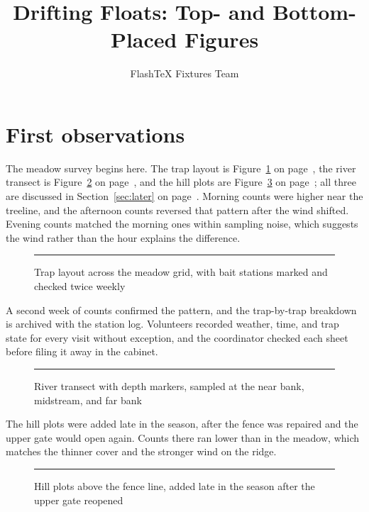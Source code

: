 \documentclass[11pt]{article}
\title{Drifting Floats: Top- and Bottom-Placed Figures}
\author{FlashTeX Fixtures Team}
\date{}
\begin{document}
\maketitle
\listoffigures
\section{First observations}
\label{sec:first}
The meadow survey begins here. The trap layout is Figure~\ref{fig:traps} on page~\pageref{fig:traps}, the river transect is Figure~\ref{fig:transect} on page~\pageref{fig:transect}, and the hill plots are Figure~\ref{fig:hill} on page~\pageref{fig:hill}; all three are discussed in Section~\ref{sec:later} on page~\pageref{sec:later}. Morning counts were higher near the treeline, and the afternoon counts reversed that pattern after the wind shifted. Evening counts matched the morning ones within sampling noise, which suggests the wind rather than the hour explains the difference.
\begin{figure}[t]
\centering
\rule{0.7\textwidth}{2.5cm}
\caption{Trap layout across the meadow grid, with bait stations marked and checked twice weekly}
\label{fig:traps}
\end{figure}
A second week of counts confirmed the pattern, and the trap-by-trap breakdown is archived with the station log. Volunteers recorded weather, time, and trap state for every visit without exception, and the coordinator checked each sheet before filing it away in the cabinet.
\begin{figure}[b]
\centering
\rule{0.7\textwidth}{2.5cm}
\caption{River transect with depth markers, sampled at the near bank, midstream, and far bank}
\label{fig:transect}
\end{figure}
The hill plots were added late in the season, after the fence was repaired and the upper gate would open again. Counts there ran lower than in the meadow, which matches the thinner cover and the stronger wind on the ridge.
\begin{figure}[t]
\centering
\rule{0.7\textwidth}{2.5cm}
\caption{Hill plots above the fence line, added late in the season after the upper gate reopened}
\label{fig:hill}
\end{figure}
\end{document}
